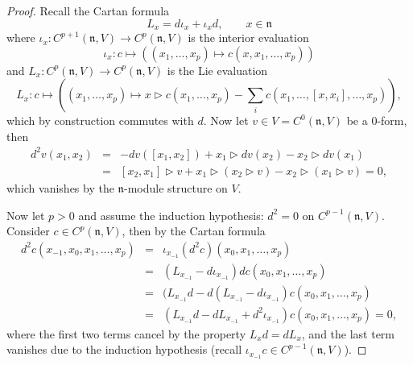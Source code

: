 \documentclass[10pt,a4paper]{amsart}
\begin{document}
\begin{proof}
Recall the { {Cartan formula}}
\begin{equation}
    L_x = d\iota_x + \iota_x d,\qquad x\in\mathfrak{n}\nonumber
\end{equation}
where $\iota_x:C^{p+1}(\mathfrak{n},V)\rightarrow C^p(\mathfrak{n},V)$ is the interior evaluation
\begin{equation}
    \iota_x:c \mapsto ((x_1,\dots,x_p)\mapsto c(x,x_1,\dots,x_p)) \nonumber
\end{equation}
and $L_x: C^p(\mathfrak{n},V)\rightarrow C^p(\mathfrak{n},V)$ is the Lie evaluation
\begin{equation}
    L_x:c\mapsto ((x_1,\dots,x_p)\mapsto x\rhd c(x_1,\dots,x_p) - \sum_i c(x_1,\dots,[x,x_i],\dots,x_p)),\nonumber
\end{equation}
which by construction commutes with $d$. Now let $v\in V = C^0(\mathfrak{n},V)$ be a 0-form, then
\begin{eqnarray}
    d^2v(x_1,x_2) &=& -dv([x_1,x_2]) + x_1\rhd dv(x_2) - x_2\rhd dv(x_1) \nonumber \\
    &=& [x_2,x_1]\rhd v + x_1\rhd (x_2 \rhd v) - x_2\rhd (x_1\rhd v) = 0,\nonumber
\end{eqnarray}
which vanishes by the $\mathfrak{n}$-module structure on $V$. 

Now let $p>0$ and assume the induction hypothesis: $d^2=0$ on $C^{p-1}(\mathfrak{n},V)$. Consider $c\in C^p(\mathfrak{n},V)$, then by the Cartan formula
\begin{eqnarray}
    d^2c(x_{-1},x_0,x_1,\dots,x_p) &=& \iota_{x_{-1}}(d^2c)(x_0,x_1,\dots,x_p) \nonumber\\
    &=& (L_{x_{-1}} - d\iota_{x_{-1}})dc(x_0,x_1,\dots,x_p) \nonumber \\
    &=& (L_{x_{-1}}d - d(L_{x_{-1}} - d\iota_{x_{-1}})c(x_0,x_1,\dots,x_p) \nonumber \\
    &=& (L_{x_{-1}}d - dL_{x_{-1}} + d^2\iota_{x_{-1}})c(x_0,x_1,\dots,x_p) = 0,\nonumber
\end{eqnarray}
where the first two terms cancel by the property $L_xd=dL_x$, and the last term vanishes due to the induction hypothesis (recall $\iota_{x_{-1}}c\in C^{p-1}(\mathfrak{n},V)$).
\end{proof}
\end{document}
